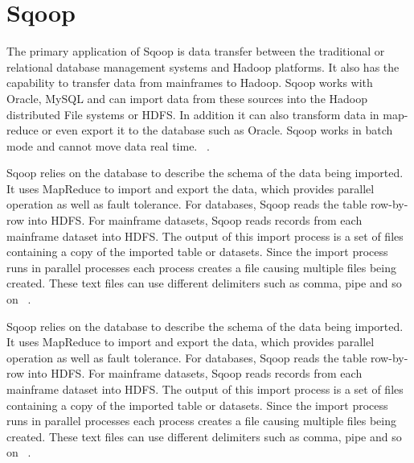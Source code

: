 \section{Sqoop}

The primary application of Sqoop is data transfer between the 
traditional or relational database management systems and 
Hadoop platforms. It also has the capability to transfer data 
from mainframes to Hadoop. Sqoop works with Oracle, MySQL and
can import data from these sources into the Hadoop distributed 
File systems or HDFS. In addition it can also transform data in 
map-reduce or even export it to the database such as Oracle.
Sqoop works in batch mode and cannot move data real time.
~\cite{hid-sp18-517-Sqoop}.

Sqoop relies on the database to describe the schema of the data 
being imported. It uses MapReduce to import and export the data, 
which provides parallel operation as well as fault tolerance. 
For databases, Sqoop reads the table row-by-row into HDFS. 
For mainframe datasets, Sqoop reads records from each mainframe 
dataset into HDFS. The output of this import process is a set of 
files containing a copy of the imported table or datasets. Since 
the import process runs in parallel processes each process 
creates a file causing multiple files being created. These text 
files can use different delimiters such as comma, pipe and so on 
~\cite{hid-sp18-517-Sqoop}.

Sqoop relies on the database to describe the schema of the data 
being imported. It uses MapReduce to import and export the data, 
which provides parallel operation as well as fault tolerance. 
For databases, Sqoop reads the table row-by-row into HDFS. 
For mainframe datasets, Sqoop reads records from each mainframe 
dataset into HDFS. The output of this import process is a set of 
files containing a copy of the imported table or datasets. Since 
the import process runs in parallel processes each process 
creates a file causing multiple files being created. These text 
files can use different delimiters such as comma, pipe and so on 
~\cite{hid-sp18-517-Sqoop}.


